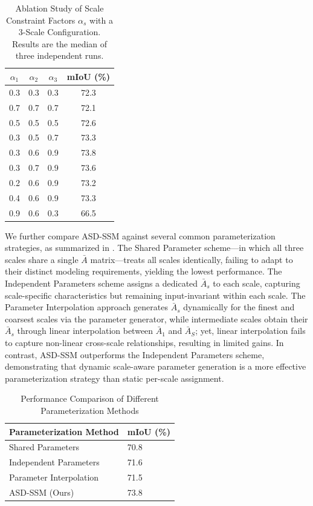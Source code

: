 \documentclass[a4paper,fleqn]{cas-sc}
\begin{document}
\begin{table}[!t]
	\centering
	\caption{Ablation Study of Scale Constraint Factors $\alpha_s$ with a 3-Scale Configuration. Results are the median of three independent runs.}
	\label{tab:scale_constraint}
	\begin{tabular}{cccc}
		\toprule
		$\alpha_1$ & $\alpha_2$ & $\alpha_3$ & \textbf{mIoU (\%)} \\
		\midrule
		0.3 & 0.3 & 0.3 & 72.3 \\
		0.7 & 0.7 & 0.7 & 72.1 \\
		0.5 & 0.5 & 0.5 & 72.6 \\
		0.3 & 0.5 & 0.7 & 73.3 \\
		0.3 & 0.6 & 0.9 & 73.8 \\
		0.3 & 0.7 & 0.9 & 73.6 \\
		0.2 & 0.6 & 0.9 & 73.2 \\
		0.4 & 0.6 & 0.9 & 73.3 \\
		0.9 & 0.6 & 0.3 & 66.5 \\
		\bottomrule
	\end{tabular}
\end{table}

We further compare ASD-SSM against several common parameterization strategies, as summarized in . The Shared Parameter scheme---in which all three scales share a single $\bar{A}$ matrix---treats all scales identically, failing to adapt to their distinct modeling requirements, yielding the lowest performance. The Independent Parameters scheme assigns a dedicated  $\bar{A}_s$ to each scale, capturing scale-specific characteristics but remaining input-invariant within each scale. The Parameter Interpolation approach generates $\bar{A}_s$ dynamically for the finest and coarsest scales via the parameter generator, while intermediate scales obtain their $\bar{A}_s$ through linear interpolation between $\bar{A}_1$ and $\bar{A}_S$; yet, linear interpolation fails to capture non-linear cross-scale relationships, resulting in limited gains. In contrast, ASD-SSM outperforms the Independent Parameters scheme, demonstrating that dynamic scale-aware parameter generation is a more effective parameterization strategy than static per-scale assignment.

\begin{table}[!t]
	\centering
	\caption{Performance Comparison of Different Parameterization Methods}
	\label{tab:param_comparison}
	\begin{tabular}{ll}
		\toprule
		\textbf{Parameterization Method} & \textbf{mIoU (\%)} \\
		\midrule
		Shared Parameters & 70.8 \\
		Independent Parameters & 71.6 \\
		Parameter Interpolation & 71.5 \\
		ASD-SSM (Ours) & 73.8 \\
		\bottomrule
	\end{tabular}
\end{table}
\end{document}
